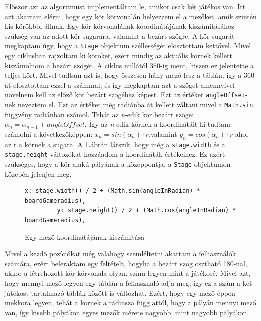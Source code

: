 \documentclass[a4paper,twoside]{article}
\begin{document}
Először azt az algoritmust implementáltam le, amikor csak két játékos van. Itt azt akartam elérni, hogy egy kör körvonalán helyezzem el a mezőket, amik szintén kis körökből állnak. Egy kör körvonalának koordinátájának kiszámításához szükség van az adott kör sugarára, valamint a bezárt szögre. A kör sugarát megkaptam úgy, hogy a \verb|Stage| objektum széllességét elosztottam kettővel. Mivel egy ciklusban rajzoltam ki köröket, ezért mindig az aktuális körnek kellett kiszámolnom  a bezárt szögét. A ciklus nullától 360-ig ment, hiszen ez jelentette a teljes kört. Mivel tudtam azt is, hogy összesen hány mező lesz a táblán, így a 360-at elosztottam ezzel a számmal, és így megkaptam azt a szöget amennyivel növelnem kell az előző kör bezárt szögéhez képest. Ezt az értéket \verb|angleOffset|-nek neveztem el. Ezt az értéket még radiánba át kellett váltani mivel a \verb|Math.sin| függvény radiánban számol.  Tehát az \textit{n}-edik kör bezárt szöge: \(\alpha_{n} = \alpha_{n-1} + angleOffset\). Így az \textit{n}-edik körnek a koordinátáit ki tudtam számolni a következőképpen: 
\(x_{n} = sin(\alpha_{n})\cdot r\),valamint \(y_{n} = cos(\alpha_{n})\cdot r\) ahol az r a körnek a sugara. A \ref{kettesPlayerKoord}.ábrán látszik, hogy még a \verb|stage.width| és a \verb|stage.height| változókat hozzáadom a koordináták értékeihez. Ez azért szükséges, hogy a kör alakú pályának a középpontja, a \verb|Stage| objektumon közepén jelenjen meg. 

\begin{figure}
	\caption{Egy mező koordinátájának kiszámítása}
	\begin{minipage}{\textwidth}
		\begin{lstlisting}[style=javascriptStyle]
		 x: stage.width() / 2 + (Math.sin(angleInRadian) * boardGameradius),
	   	 y: stage.height() / 2 + (Math.cos(angleInRadian) * boardGameradius),
		\end{lstlisting}
	\end{minipage}
	
	\label{kettesPlayerKoord}
\end{figure}

Mivel a kezdő pozíciókat még valahogy szemléltetni akartam a felhasználók számára, ezért beleraktam egy feltételt, hogyha a bezárt szög osztható 180-nal, akkor a létrehozott kör körvonala olyan, színű legyen mint a játékosé. Mivel azt, hogy mennyi mező legyen egy táblán a felhasználó adja meg, így ez a szám a két játékost tartalmazó táblák között is változhat. Ezért, hogy egy mező éppen mekkora legyen, tehát a körnek a rádiusza függ attól, hogy a pályán mennyi mező van, így kisebb pályákon egyes mezők mérete nagyobb, mint nagyobb pályákon.
\end{document}
